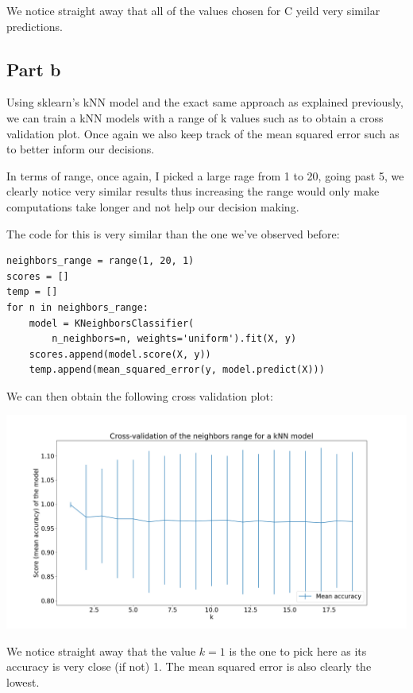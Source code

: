 \documentclass[10pt]{article}
\begin{document}
We notice straight away that all of the values chosen for C yeild
very similar predictions.

\subsection*{Part b}

Using sklearn's kNN model and the exact same approach as explained
previously, we can train a kNN models with a range of k values
such as to obtain a cross validation plot. Once again we also
keep track of the mean squared error such as to better inform our
decisions.

In terms of range, once again, I picked a large rage from 1 to 20,
going past 5, we clearly notice very similar results thus increasing the range
would only make computations take longer and not help our decision making.

The code for this is very similar than the one we've observed before:

\begin{lstlisting}
neighbors_range = range(1, 20, 1)
scores = []
temp = []
for n in neighbors_range:
    model = KNeighborsClassifier(
        n_neighbors=n, weights='uniform').fit(X, y)
    scores.append(model.score(X, y))
    temp.append(mean_squared_error(y, model.predict(X)))
\end{lstlisting}

We can then obtain the following cross validation plot:

\begin{center}
    \includegraphics[scale=0.25]{ds_1_knn_cv.png}
\end{center}
\vspace{5mm} %

We notice straight away that the value $ k = 1 $ is the one to pick
here as its accuracy is very close (if not) 1. The mean squared error is also clearly the lowest.
\end{document}
